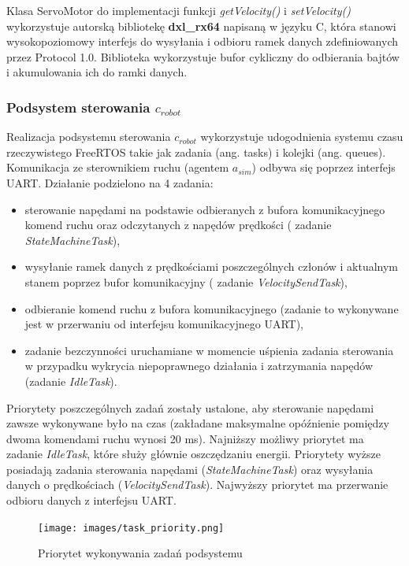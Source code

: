 \documentclass[a4paper, 12pt, twoside]{article}
\begin{document}
Klasa ServoMotor do implementacji funkcji \textit{getVelocity()} i \textit{setVelocity()} wykorzystuje autorską bibliotekę \textbf{dxl\_rx64} napisaną w języku C, która stanowi wysokopoziomowy interfejs do wysyłania i odbioru ramek danych zdefiniowanych przez Protocol 1.0. Biblioteka wykorzystuje bufor cykliczny do odbierania bajtów i akumulowania ich do ramki danych.

\subsubsection{Podsystem sterowania $c_{robot}$}

Realizacja podsystemu sterowania $c_{robot}$ wykorzystuje udogodnienia systemu czasu rzeczywistego FreeRTOS takie jak zadania (ang. tasks) i kolejki (ang. queues). Komunikacja ze sterownikiem ruchu (agentem $a_{sim}$) odbywa się poprzez interfejs UART. Działanie podzielono na 4 zadania:

\begin{itemize}
\item sterowanie napędami na podstawie odbieranych z bufora komunikacyjnego komend ruchu oraz odczytanych z napędów prędkości ( zadanie \textit{StateMachineTask}),
\item wysyłanie ramek danych z prędkościami poszczególnych członów i aktualnym stanem poprzez bufor komunikacyjny ( zadanie \textit{VelocitySendTask}),
\item odbieranie komend ruchu z bufora komunikacyjnego (zadanie to wykonywane jest w przerwaniu od interfejsu komunikacyjnego UART),
\item zadanie bezczynności uruchamiane w momencie uśpienia zadania sterowania w przypadku wykrycia niepoprawnego działania i zatrzymania napędów (zadanie \textit{IdleTask}).
\end{itemize} 

Priorytety poszczególnych zadań zostały ustalone, aby sterowanie napędami zawsze wykonywane było na czas (zakładane maksymalne opóźnienie pomiędzy dwoma komendami ruchu wynosi 20 ms). Najniższy możliwy priorytet ma zadanie \textit{IdleTask}, które służy głównie oszczędzaniu energii. Priorytety wyższe posiadają zadania sterowania napędami (\textit{StateMachineTask}) oraz wysyłania danych o prędkościach (\textit{VelocitySendTask}). Najwyższy priorytet ma przerwanie odbioru danych z interfejsu UART.

\begin{figure}[hbt!]
\centering
\texttt{[image: images/task\_priority.png]}
\caption{Priorytet wykonywania zadań podsystemu}
\label{fig:task_priority}
\end{figure}
\end{document}
